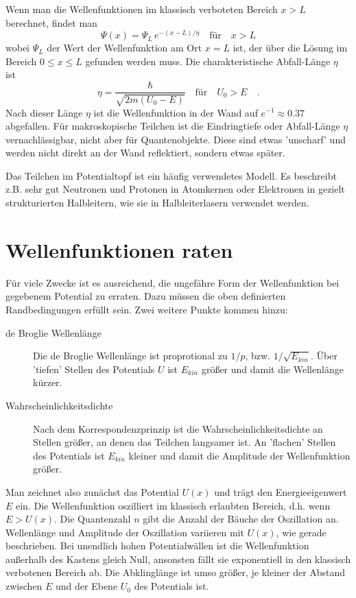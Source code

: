 Wenn man die Wellenfunktionen im klassisch verboteten Bereich $x > L$ berechnet, findet man
\begin{equation}
\Psi(x) = \Psi_L \, e^{- (x-L)/ \eta} \quad \text{für} \quad x > L
\end{equation}
wobei $\Psi_L$ der Wert der Wellenfunktion am Ort $x=L$ ist, der über die Lösung im Bereich $0 \le x \le L$ gefunden werden muss. Die charakteristische  Abfall-Länge $\eta$ ist
\begin{equation}
    \eta = \frac{\hbar}{\sqrt{2m ( U_0 - E)}} \quad \text{für} \quad U_0 > E \quad .
\end{equation}
Nach dieser Länge $\eta$ ist die Wellenfunktion in der Wand auf $e^{-1} \approx 0.37$ abgefallen. Für makroskopische Teilchen ist die Eindringtiefe oder Abfall-Länge $\eta$ vernachlässigbar, nicht aber für Quantenobjekte. Diese sind etwas 'unscharf' und werden nicht direkt an der Wand reflektiert, sondern etwas später.

Das Teilchen im Potentialtopf ist ein häufig verwendetes Modell. Es beschreibt z.B. sehr gut Neutronen und Protonen in Atomkernen oder Elektronen in gezielt strukturierten Halbleitern, wie sie in Halbleiterlasern verwendet werden.

\section{Wellenfunktionen raten}

Für viele Zwecke ist es ausreichend, die ungefähre Form der Wellenfunktion bei gegebenem Potential zu erraten. Dazu müssen die oben definierten Randbedingungen erfüllt sein. Zwei weitere Punkte kommen hinzu:
\begin{description}
    \item[de Broglie Wellenlänge] Die de Broglie Wellenlänge ist proprotional zu $1/p$, bzw. $1/\sqrt{E_{kin}}$. Über 'tiefen' Stellen des Potentials $U$ ist $E_{kin}$ größer und damit die Wellenlänge kürzer.
    \item[Wahrscheinlichkeitsdichte] Nach dem Korrespondenzprinzip ist die Wahrscheinlichkeitsdichte an Stellen größer, an denen das Teilchen langsamer ist. An 'flachen' Stellen des Potentials ist $E_{kin}$ kleiner und damit die Amplitude der Wellenfunktion größer.
\end{description}

Man zeichnet also zunächst das Potential $U(x)$ und trägt den Energieeigenwert $E$ ein. Die Wellenfunktion oszilliert im klassisch erlaubten Bereich, d.h. wenn $E > U(x)$. Die Quantenzahl $n$ gibt die Anzahl der Bäuche der Oszillation an. Wellenlänge und Amplitude der Oszillation variieren mit $U(x)$, wie gerade beschrieben. Bei unendlich hohen Potentialwällen ist die Wellenfunktion außerhalb des Kastens gleich Null, ansonsten fällt sie exponentiell in den klassisch verbotenen Bereich ab. Die Abklinglänge ist umso größer, je kleiner der Abstand zwischen $E$ und der Ebene $U_0$ des Potentials ist.


